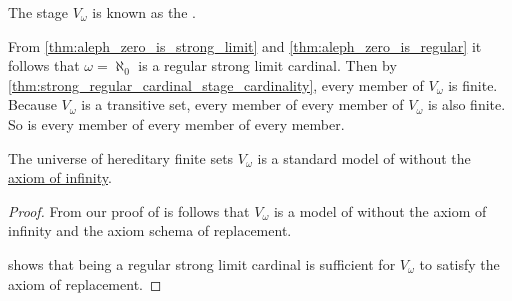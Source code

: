 \begin{definition}\label{def:universe_of_hereditary_finite_sets}
  The stage \( V_\omega \) is known as the .
\end{definition}
\begin{comments}
  \item From \cref{thm:aleph_zero_is_strong_limit} and \cref{thm:aleph_zero_is_regular} it follows that \( \omega = \aleph_0 \) is a regular strong limit cardinal. Then by \cref{thm:strong_regular_cardinal_stage_cardinality}, every member of \( V_\omega \) is finite. Because \( V_\omega \) is a transitive set, every member of every member of \( V_\omega \) is also finite. So is every member of every member of every member.
\end{comments}

\begin{proposition}\label{thm:cumulative_hierarchy_model_of_zfc_without_infinity}
  The universe of hereditary finite sets \hyperref[def:universe_of_hereditary_finite_sets]{\( V_\omega \)} is a standard model of  without the \hyperref[def:zfc/infinity]{axiom of infinity}.
\end{proposition}
\begin{proof}
  From our proof of  is follows that \( V_\omega \) is a model of  without the axiom of infinity and the axiom schema of replacement.

   shows that being a regular strong limit cardinal is sufficient for \( V_\omega \) to satisfy the axiom of replacement.
\end{proof}

